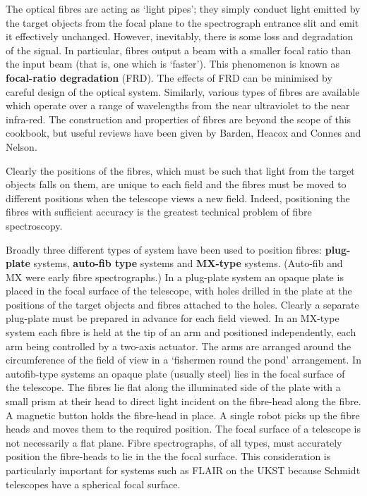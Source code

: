 \documentclass[twoside,11pt]{starlink}
\begin{document}
The optical fibres are acting as `light pipes'; they simply conduct
light emitted by the target objects from the focal plane to the
spectrograph entrance slit and emit it effectively unchanged.  However,
inevitably, there is some loss and degradation of the signal.  In
particular, fibres output a beam with a smaller focal ratio than the
input beam (that is, one which is `faster').  This phenomenon is known
as \textbf{focal-ratio degradation} (FRD).  The effects of FRD can be
minimised by careful design of the optical system.  Similarly, various
types of fibres are available which operate over a range of wavelengths
from the near ultraviolet to the near infra-red.  The construction and
properties of fibres are beyond the scope of this cookbook, but useful
reviews have been given by Barden\cite{BARDEN98}, Heacox and
Connes\cite{HEACOX92} and Nelson\cite{NELSON88}.

Clearly the positions of the fibres, which must be such that light
from the target objects falls on them, are unique to each field and
the fibres must be moved to different positions when the telescope
views a new field.  Indeed, positioning the fibres with sufficient
accuracy is the greatest technical problem of fibre spectroscopy.

Broadly three different types of system have been used to position
fibres: \textbf{plug-plate} systems, \textbf{auto-fib type} systems and
\textbf{MX-type} systems.  (Auto-fib and MX were early fibre spectrographs.)
In a plug-plate system an opaque plate is placed in the focal surface
of the telescope, with holes drilled in the plate at the
positions of the target objects and fibres attached to the holes.
Clearly a separate plug-plate must be prepared in advance for each
field viewed.  In an MX-type system each fibre is held at the tip of an
arm and positioned independently, each arm being controlled by a
two-axis actuator.  The arms are arranged around the circumference
of the field of view in a `fishermen round the pond' arrangement.
In autofib-type systems an opaque plate (usually steel) lies in
the focal surface of the telescope.  The fibres lie flat along the
illuminated side of the plate with a small prism at their head to
direct light incident on the fibre-head along the fibre.  A magnetic
button holds the fibre-head in place.  A single robot picks up the
fibre heads and moves them to the required position.  The focal
surface of a telescope is not necessarily a flat plane.  Fibre
spectrographs, of all types, must accurately position the fibre-heads
to lie in the the focal surface.  This consideration is particularly
important for systems such as FLAIR on the UKST because Schmidt
telescopes have a spherical focal surface.
\end{document}
